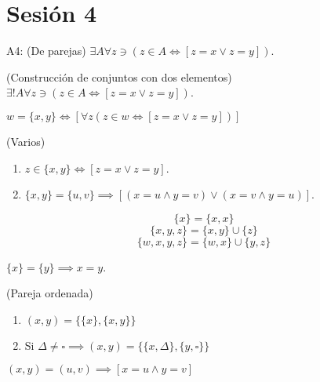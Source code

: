 \section{Sesión 4}

\begin{cajita}
	A4: (De parejas) $\exists A\forall z\ni (z\in A\iff [z=x\vee z=y])$. 
\end{cajita}


\begin{teorema}(Construcción de conjuntos con dos elementos)
	$\exists ! A \forall z\ni (z\in A\iff [z=x\vee z=y])$. 
\end{teorema}

\begin{definicion}
	$w=\{x,y\}\iff [\forall z(z\in w\iff[z=x\vee z=y] )]$
\end{definicion}

\begin{teorema}(Varios)
	\begin{enumerate}
		\item 	$z\in \{x,y\}\iff [z=x\vee z=y]$.
		\item $\{x,y\}=\{u,v\}\implies [(x=u\wedge y=v)\vee (x=v\wedge y=u)]$.
	\end{enumerate}
\end{teorema}

\begin{teorema}
	$$\{x\}=\{x,x\}$$
	$$\{x,y,z\}=\{x,y\}\cup \{z\}$$
	$$\{w,x,y,z\}=\{w,x\}\cup \{y,z\}$$
\end{teorema}

\begin{teorema}
	$\{x\}=\{y\}\implies x=y$. 
\end{teorema}

\begin{definicion}(Pareja ordenada)
	\begin{enumerate}
		\item $(x,y)=\{\{x\},\{x,y\}\}$
		\item Si $\Delta \neq \square \implies (x,y)=\{\{x,\Delta\}, \{y,\square\}\}$
	\end{enumerate}
\end{definicion}

\begin{teorema}
	$(x,y)=(u,v)\implies [x=u\wedge y=v]$
\end{teorema}
%